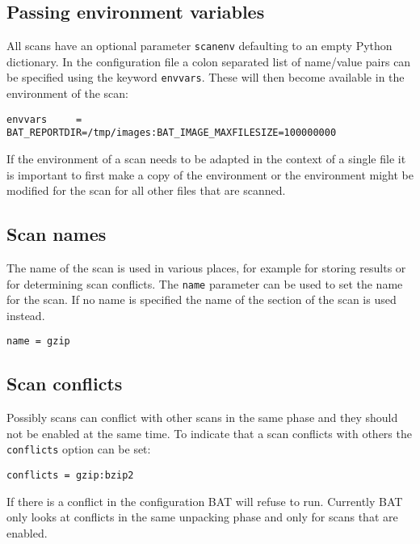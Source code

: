 \documentclass[10pt,a4paper]{article}
\begin{document}
\subsection{Passing environment variables}

All scans have an optional parameter \texttt{scanenv} defaulting to an empty
Python dictionary. In the configuration file a colon separated list of
name/value pairs can be specified using the keyword \texttt{envvars}. These will
then become available in the environment of the scan:

\begin{verbatim}
envvars     = BAT_REPORTDIR=/tmp/images:BAT_IMAGE_MAXFILESIZE=100000000
\end{verbatim}

If the environment of a scan needs to be adapted in the context of a single
file it is important to first make a copy of the environment or the
environment might be modified for the scan for all other files that are scanned.

\subsection{Scan names}

The name of the scan is used in various places, for example for storing results
or for determining scan conflicts. The \texttt{name} parameter can be used to
set the name for the scan. If no name is specified the name of the section of
the scan is used instead.

\begin{verbatim}
name = gzip
\end{verbatim}

\subsection{Scan conflicts}

Possibly scans can conflict with other scans in the same phase and they should
not be enabled at the same time. To indicate that a scan conflicts with others
the \texttt{conflicts} option can be set:

\begin{verbatim}
conflicts = gzip:bzip2
\end{verbatim}

If there is a conflict in the configuration BAT will refuse to run. Currently
BAT only looks at conflicts in the same unpacking phase and only for scans that
are enabled.
\end{document}
